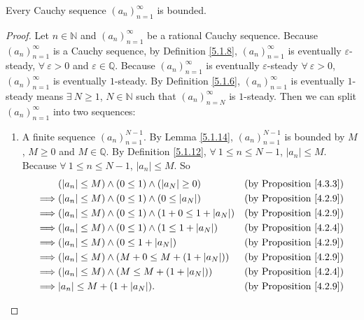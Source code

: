 \begin{lemma}\label{5.1.15}
Every Cauchy sequence \((a_n)_{n = 1}^{\infty}\) is bounded.
\end{lemma}

\begin{proof}
Let \(n \in \mathds{N}\) and \((a_n)_{n = 1}^{\infty}\) be a rational Cauchy sequence.
Because \((a_n)_{n = 1}^{\infty}\) is a Cauchy sequence, by Definition \ref{5.1.8}, \((a_n)_{n = 1}^{\infty}\) is eventually \(\varepsilon\)-steady, \(\forall\ \varepsilon > 0\) and \(\varepsilon \in \mathds{Q}\).
Because \((a_n)_{n = 1}^{\infty}\) is eventually \(\varepsilon\)-steady \(\forall\ \varepsilon > 0\), \((a_n)_{n = 1}^{\infty}\) is eventually \(1\)-steady.
By Definition \ref{5.1.6}, \((a_n)_{n = 1}^{\infty}\) is eventually \(1\)-steady means \(\exists\ N \geq 1\), \(N \in \mathds{N}\) such that \((a_n)_{n = N}^{\infty}\) is \(1\)-steady.
Then we can split \((a_n)_{n = 1}^{\infty}\) into two sequences:
\begin{enumerate}
    \item A finite sequence \((a_n)_{n = 1}^{N - 1}\).
    By Lemma \ref{5.1.14}, \((a_n)_{n = 1}^{N - 1}\) is bounded by \(M\), \(M \geq 0\) and \(M \in \mathds{Q}\).
    By Definition \ref{5.1.12}, \(\forall\ 1 \leq n \leq N - 1\), \(|a_n| \leq M\).
    Because \(\forall\ 1 \leq n \leq N - 1\), \(|a_n| \leq M\).
    So
    \begin{align*}
    & (|a_n| \leq M) \land (0 \leq 1) \land (|a_N| \geq 0) & \text{(by Proposition \ref{4.3.3})} \\
    \implies & (|a_n| \leq M) \land (0 \leq 1) \land (0 \leq |a_N|) & \text{(by Proposition \ref{4.2.9})} \\
    \implies & (|a_n| \leq M) \land (0 \leq 1) \land (1 + 0 \leq 1 + |a_N|) & \text{(by Proposition \ref{4.2.9})} \\
    \implies & (|a_n| \leq M) \land (0 \leq 1) \land (1 \leq 1 + |a_N|) & \text{(by Proposition \ref{4.2.4})} \\
    \implies & (|a_n| \leq M) \land (0 \leq 1 + |a_N|) & \text{(by Proposition \ref{4.2.9})} \\
    \implies & (|a_n| \leq M) \land (M + 0 \leq M + (1 + |a_N|)) & \text{(by Proposition \ref{4.2.9})} \\
    \implies & (|a_n| \leq M) \land (M \leq M + (1 + |a_N|)) & \text{(by Proposition \ref{4.2.4})} \\
    \implies & |a_n| \leq  M + (1 + |a_N|). & \text{(by Proposition \ref{4.2.9})}
    \end{align*}

\end{enumerate}
\end{proof}
